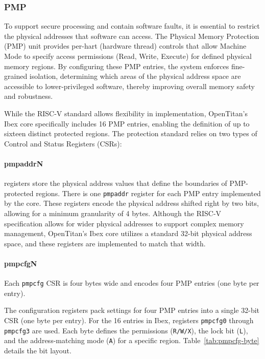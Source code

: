 \documentclass[10pt,a4paper,twocolumn,twoside]{article}
\begin{document}
\subsubsection{PMP}
To support secure processing and contain software faults, it is essential to restrict the physical addresses that software can access. The Physical Memory Protection (PMP) unit provides per-hart (hardware thread) controls that allow Machine Mode to specify access permissions (Read, Write, Execute) for defined physical memory regions. By configuring these PMP entries, the system enforces fine-grained isolation, determining which areas of the physical address space are accessible to lower-privileged software, thereby improving overall memory safety and robustness.

While the RISC-V standard allows flexibility in implementation, OpenTitan's Ibex core specifically includes 16 PMP entries, enabling the definition of up to sixteen distinct protected regions. The protection standard relies on two types of Control and Status Registers (CSRs):

\paragraph{pmpaddrN} registers store the physical address values that define the boundaries of PMP-protected regions. There is one \texttt{pmpaddr} register for each PMP entry implemented by the core. These registers encode the physical address shifted right by two bits, allowing for a minimum granularity of 4 bytes. Although the RISC-V specification allows for wider physical addresses to support complex memory management, OpenTitan's Ibex core utilizes a standard 32-bit physical address space, and these registers are implemented to match that width.

\paragraph{pmpcfgN} Each \texttt{pmpcfg} CSR is four bytes wide and encodes four PMP entries (one byte per entry). 

The configuration registers pack settings for four PMP entries into a single 32-bit CSR (one byte per entry). For the 16 entries in Ibex, registers \texttt{pmpcfg0} through \texttt{pmpcfg3} are used. Each byte defines the permissions (\texttt{R/W/X}), the lock bit (\texttt{L}), and the address-matching mode (\texttt{A}) for a specific region. Table~\ref{tab:pmpcfg-byte} details the bit layout.
\end{document}
